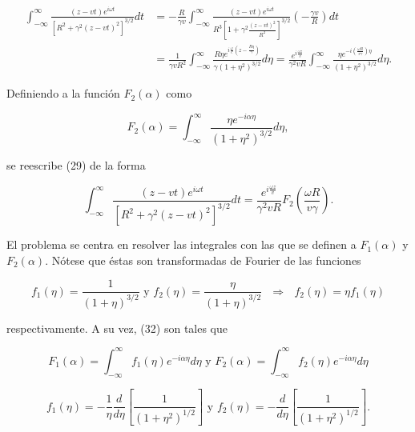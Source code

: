 \documentclass[a4paper,10pt]{article}
\begin{document}
\begin{equation*}
\begin{aligned}
\int_{-\infty}^{\infty} \frac{(z-vt)e^{i\omega t}}{[R^2+\gamma^2(z-vt)^2]^{3/2}} dt &= -\frac{R}{\gamma v} \int_{-\infty}^{\infty} \frac{(z-vt)e^{i\omega t}}{R^3 \left[ 1+ \gamma^2 \frac{(z-vt)^2}{R^2} \right]^{3/2}} \left( -\frac{\gamma v}{R} \right) dt \\
	&= \frac{1}{\gamma vR^2} \int_{-\infty}^{\infty} \frac{R\eta e^{i\frac{\omega}{c}\left( z-\frac{R\eta}{\gamma}\right)}}{\gamma(1+\eta^2)^{3/2}} d\eta
	=\frac{e^{i\frac{\omega z}{v}} }{\gamma^2 vR}\int_{-\infty}^{\infty} \frac{\eta e^{-i\left(\frac{\omega R}{v\gamma}\right)\eta}}{(1+\eta^2)^{3/2}} d\eta.
\end{aligned}
\end{equation*}

Definiendo a la función $F_2(\alpha)$ como

\begin{equation}
F_2(\alpha)=\int_{-\infty}^{\infty} \frac{\eta e^{-i\alpha\eta}}{(1+\eta^2)^{3/2}} d\eta,
\end{equation}

se reescribe (29) de la forma

\begin{equation}
\int_{-\infty}^{\infty} \frac{(z-vt)e^{i\omega t}}{[R^2+\gamma^2(z-vt)^2]^{3/2}} dt =\frac{e^{i\frac{\omega z}{v}} }{\gamma^2 vR} F_2\left( \frac{\omega R}{v\gamma}\right).
\end{equation}

El problema se centra en resolver las integrales con las que se definen a $F_1(\alpha)$ y $F_2(\alpha)$. Nótese que éstas son transformadas de Fourier de las funciones 

\begin{equation}
f_1(\eta)=\frac{1}{(1+\eta)^{3/2}}	\text{		y		} f_2(\eta)=\frac{\eta}{(1+\eta)^{3/2}}	 \text{      $\Rightarrow$      } f_2(\eta)=\eta f_1(\eta)
\end{equation}

respectivamente. A su vez, (32) son tales que

\begin{equation}
F_1(\alpha)=\int_{-\infty}^{\infty} f_1(\eta) e^{-i\alpha\eta} d\eta \text{		y		} F_2(\alpha)=\int_{-\infty}^{\infty} f_2(\eta) e^{-i\alpha\eta} d\eta
\end{equation}

\begin{equation}
f_1(\eta)=-\frac{1}{\eta}\frac{d}{d\eta}\left[\frac{1}{(1+\eta^2)^{1/2}}\right] \text{		y		} f_2(\eta)=-\frac{d}{d\eta}\left[\frac{1}{(1+\eta^2)^{1/2}}\right].
\end{equation}
\end{document}
